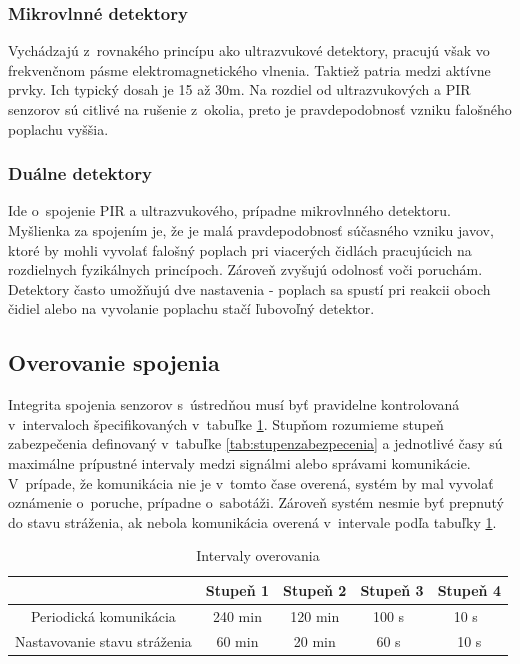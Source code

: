 \subsubsection{Mikrovlnné detektory}

Vychádzajú z~rovnakého princípu ako ultrazvukové detektory, pracujú však vo frekvenčnom pásme elektromagnetického vlnenia. Taktiež patria medzi aktívne prvky. Ich typický dosah je 15 až 30m. Na rozdiel od ultrazvukových a PIR senzorov sú citlivé na rušenie z~okolia, preto je pravdepodobnosť vzniku falošného poplachu vyššia.\cite{velas_ezs}

\subsubsection{Duálne detektory}

Ide o~spojenie PIR a ultrazvukového, prípadne mikrovlnného detektoru. Myšlienka za spojením je, že je malá pravdepodobnosť súčasného vzniku javov, ktoré by mohli vyvolať falošný poplach pri viacerých čidlách pracujúcich na rozdielnych fyzikálnych princípoch. Zároveň zvyšujú odolnosť voči poruchám. Detektory často umožňujú dve nastavenia - poplach sa spustí pri reakcii oboch čidiel alebo na vyvolanie poplachu stačí ľubovoľný detektor.\cite{velas_ezs}

\subsection{Overovanie spojenia}

Integrita spojenia senzorov s~ústredňou musí byť pravidelne kontrolovaná v~intervaloch špecifikovaných v~tabuľke \ref{tab:interval_overenia}. Stupňom rozumieme stupeň zabezpečenia definovaný v~tabuľke \ref{tab:stupenzabezpecenia} a jednotlivé časy sú maximálne prípustné intervaly medzi signálmi alebo správami komunikácie. V~prípade, že komunikácia nie je v~tomto čase overená, systém by mal vyvolať oznámenie o~poruche, prípadne o~sabotáži. Zároveň systém nesmie byť prepnutý do stavu stráženia, ak nebola komunikácia overená v~intervale podľa tabuľky \ref{tab:interval_overenia}.

\begin{table}[ht]
    \centering
    \renewcommand{\arraystretch}{1.5}
    \begin{tabular}{|c|c|c|c|c|}
        \hline
         & Stupeň 1 & Stupeň 2 & Stupeň 3 & Stupeň 4 \\ \hline
        Periodická komunikácia & 240 min & 120 min & 100 s~& 10 s~\\ \hline
        Nastavovanie stavu stráženia & 60 min & 20 min & 60 s~& 10 s\\ \hline
    \end{tabular}
    \caption[Intervaly overovania]{Intervaly overovania\cite{csn-en-50131-1}}
    \label{tab:interval_overenia}
\end{table}



